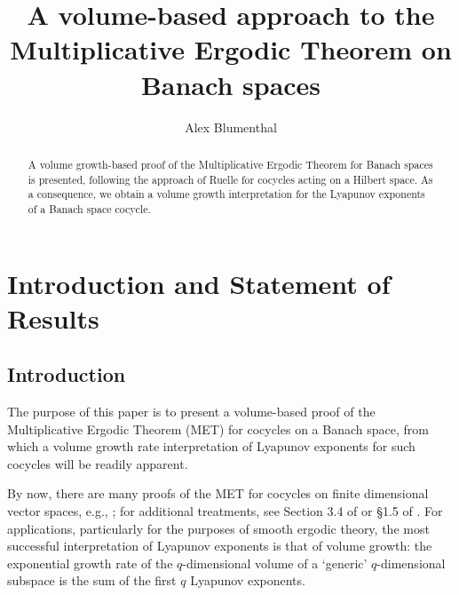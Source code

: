 \documentclass[11pt]{amsart}
\title{A volume-based approach to the Multiplicative Ergodic Theorem on Banach spaces}
\author{Alex Blumenthal}
\theoremstyle{theorem}
\theoremstyle{definition}
\numberwithin{equation}{section}
\begin{document}


\maketitle


\begin{abstract}
A volume growth-based proof of the Multiplicative Ergodic Theorem for Banach spaces is presented, following the approach of Ruelle for cocycles acting on a Hilbert space. As a consequence, we obtain a volume growth interpretation for the Lyapunov exponents of a Banach space cocycle.
\end{abstract}

\section{Introduction and Statement of Results}

\subsection{Introduction}

The purpose of this paper is to present a volume-based proof of the Multiplicative Ergodic Theorem (MET) for cocycles on a Banach space, from which a volume growth rate interpretation of Lyapunov exponents for such cocycles will be readily apparent.

By now, there are many proofs of the MET for cocycles on finite dimensional vector spaces, e.g., \cite{O, Ra, R1, W}; for additional treatments, see Section 3.4 of \cite{A} or \S 1.5 of \cite{Kr}. For applications, particularly for the purposes of smooth ergodic theory, the most successful interpretation of Lyapunov exponents is that of volume growth: the exponential growth rate of the $q$-dimensional volume of a `generic' $q$-dimensional subspace is the sum of the first $q$ Lyapunov exponents.

\end{document}
